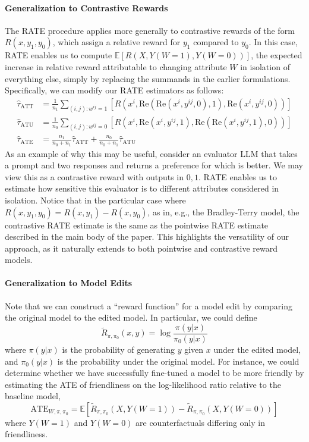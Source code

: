 \documentclass{article}
\theoremstyle{definition}
\newcommand{\EE}{\mathbb{E}}
\begin{document}
\paragraph{Generalization to Contrastive Rewards}
The RATE procedure applies more generally to contrastive rewards of the form $R(x, y_1, y_0)$, which assign a relative reward for $y_1$ compared to $y_0$. In this case, RATE enables us to compute $\EE[R(X, Y(W=1), Y(W=0))]$, the expected increase in relative reward attributable to changing attribute $W$ in isolation of everything else, simply by replacing the summands in the earlier formulations. Specifically, we can modify our RATE estimators as follows:
\begin{align*}
  \hat{\tau}_{\text{ATT}} &= \frac{1}{n_1} \sum_{(i, j): w^{ij} = 1} [R(x^i, \text{Re}(\text{Re}(x^i, y^{ij}, 0), 1), \text{Re}(x^i, y^{ij}, 0))] \\
  \hat{\tau}_{\text{ATU}} &= \frac{1}{n_0} \sum_{(i,j): w^{ij} = 0} [R(x^i, \text{Re}(x^i, y^{ij}, 1), \text{Re}(\text{Re}(x^i, y^{ij}, 1), 0))] \\
  \hat{\tau}_{\text{ATE}} &= \frac{n_1}{n_0 + n_1} \hat{\tau}_{\text{ATT}} + \frac{n_0}{n_0 + n_1} \hat{\tau}_{\text{ATU}}
\end{align*}
As an example of why this may be useful, consider an evaluator LLM that takes a prompt and two responses and returns a preference for which is better. We may view this as a contrastive reward with outputs in ${0,1}$. RATE enables us to estimate how sensitive this evaluator is to different attributes considered in isolation. Notice that in the particular case where $R(x, y_1, y_0) = R(x, y_1) - R(x, y_0)$, as in, e.g., the Bradley-Terry model, the contrastive RATE estimate is the same as the pointwise RATE estimate described in the main body of the paper. This highlights the versatility of our approach, as it naturally extends to both pointwise and contrastive reward models.

\paragraph{Generalization to Model Edits}
Note that we can construct a ``reward function'' for a model edit by comparing the original model to the edited model.  In particular, we could define
\[\tilde{R}_{\pi, \pi_0}(x, y) = \log\frac{\pi(y|x)}{\pi_0(y|x)}\]
where $\pi(y|x)$ is the probability of generating $y$ given $x$ under the edited model, and $\pi_0(y|x)$ is the probability under the original model. For instance, we could determine whether we have successfully fine-tuned a model to be more friendly by estimating the ATE of friendliness on the log-likelihood ratio relative to the baseline model, \[\text{ATE}_{W, \pi, \pi_0} = \EE[\tilde{R}_{\pi, \pi_0}(X, Y(W=1)) - \tilde{R}_{\pi, \pi_0}(X, Y(W=0))]\] where $Y(W=1)$ and $Y(W=0)$ are counterfactuals differing only in friendliness. 
\end{document}
